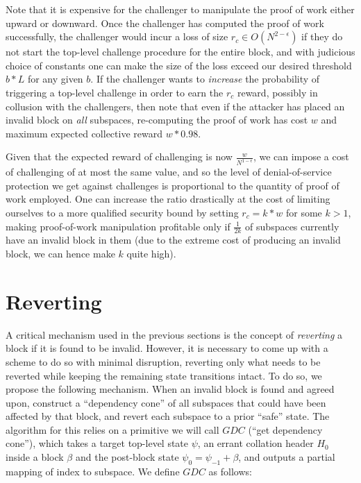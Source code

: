\documentclass[11pt,a4paper]{article}
\theoremstyle{plain}
\theoremstyle{definition}
\theoremstyle{remark}
\begin{document}
Note that it is expensive for the challenger to manipulate the proof of work either upward or downward. Once the challenger has computed the proof of work successfully, the challenger would incur a loss of size $r_c \in O(N^{2-\epsilon})$ if they do not start the top-level challenge procedure for the entire block, and with judicious choice of constants one can make the size of the loss exceed our desired threshold $b * L$ for any given $b$. If the challenger wants to \emph{increase} the probability of triggering a top-level challenge in order to earn the $r_c$ reward, possibly in collusion with the challengers, then note that even if the attacker has placed an invalid block on \emph{all} subspaces, re-computing the proof of work has cost $w$ and maximum expected collective reward $w * 0.98$.

Given that the expected reward of challenging is now $\frac{w}{N^{1-\epsilon}}$, we can impose a cost of challenging of at most the same value, and so the level of denial-of-service protection we get against challenges is proportional to the quantity of proof of work employed. One can increase the ratio drastically at the cost of limiting ourselves to a more qualified security bound by setting $r_c = k * w$ for some $k > 1$, making proof-of-work manipulation profitable only if $\frac{1}{2k}$ of subspaces currently have an invalid block in them (due to the extreme cost of producing an invalid block, we can hence make $k$ quite high).

\section{Reverting}

A critical mechanism used in the previous sections is the concept of \emph{reverting} a block if it is found to be invalid. However, it is necessary to come up with a scheme to do so with minimal disruption, reverting only what needs to be reverted while keeping the remaining state transitions intact. To do so, we propose the following mechanism. When an invalid block is found and agreed upon, construct a ``dependency cone'' of all subspaces that could have been affected by that block, and revert each subspace to a prior ``safe'' state. The algorithm for this relies on a primitive we will call $GDC$ (``get dependency cone''), which takes a target top-level state $\psi$, an errant collation header $H_0$ inside a block $\beta$ and the post-block state $\psi_0 = \psi_{-1} + \beta$, and outputs a partial mapping of index to subspace. We define $GDC$ as follows:
\end{document}
